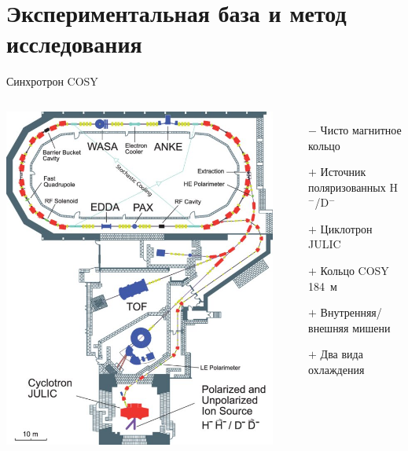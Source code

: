 \documentclass[14pt]{beamer}
\begin{document}
\section{Экспериментальная база и метод исследования}
\begin{frame}{Синхротрон COSY}
	\begin{columns}
		\centering
		\includegraphics[width=\linewidth]{COSY_facility}
		\begin{itemize}
			\item[$-$] Чисто магнитное кольцо
			\item[$+$] Источник поляризованных H$^-$/D$^-$
			\item[$+$] Циклотрон JULIC
			\item[$+$] Кольцо COSY 184~м
			\item[$+$] Внутренняя/внешняя мишени
			\item[$+$] Два вида охлаждения
		\end{itemize}
	\end{columns}
	
\end{frame}
\end{document}
